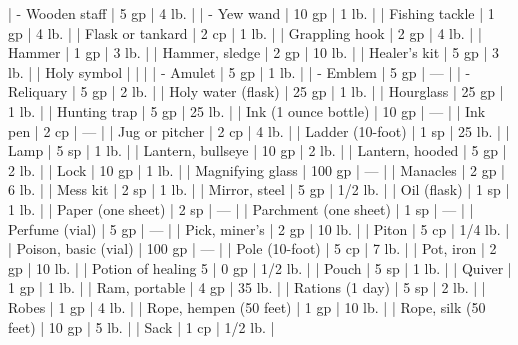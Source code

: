 | - Wooden staff               | 5 gp     | 4 lb.        |
| - Yew wand                   | 10 gp    | 1 lb.        |
| Fishing tackle               | 1 gp     | 4 lb.        |
| Flask or tankard             | 2 cp     | 1 lb.        |
| Grappling hook               | 2 gp     | 4 lb.        |
| Hammer                       | 1 gp     | 3 lb.        |
| Hammer, sledge               | 2 gp     | 10 lb.       |
| Healer's kit                 | 5 gp     | 3 lb.        |
| Holy symbol            |          |              |
| - Amulet                     | 5 gp     | 1 lb.        |
| - Emblem                     | 5 gp     | —            |
| - Reliquary                  | 5 gp     | 2 lb.        |
| Holy water (flask)           | 25 gp    | 1 lb.        |
| Hourglass                    | 25 gp    | 1 lb.        |
| Hunting trap                 | 5 gp     | 25 lb.       |
| Ink (1 ounce bottle)         | 10 gp    | —            |
| Ink pen                      | 2 cp     | —            |
| Jug or pitcher               | 2 cp     | 4 lb.        |
| Ladder (10-foot)             | 1 sp     | 25 lb.       |
| Lamp                         | 5 sp     | 1 lb.        |
| Lantern, bullseye            | 10 gp    | 2 lb.        |
| Lantern, hooded              | 5 gp     | 2 lb.        |
| Lock                         | 10 gp    | 1 lb.        |
| Magnifying glass             | 100 gp   | —            |
| Manacles                     | 2 gp     | 6 lb.        |
| Mess kit                     | 2 sp     | 1 lb.        |
| Mirror, steel                | 5 gp     | 1/2 lb.      |
| Oil (flask)                  | 1 sp     | 1 lb.        |
| Paper (one sheet)            | 2 sp     | —            |
| Parchment (one sheet)        | 1 sp     | —            |
| Perfume (vial)               | 5 gp     | —            |
| Pick, miner's                | 2 gp     | 10 lb.       |
| Piton                        | 5 cp     | 1/4 lb.      |
| Poison, basic (vial)         | 100 gp   | —            |
| Pole (10-foot)               | 5 cp     | 7 lb.        |
| Pot, iron                    | 2 gp     | 10 lb.       |
| Potion of healing 5          | 0 gp     | 1/2 lb.      |
| Pouch                        | 5 sp     | 1 lb.        |
| Quiver                       | 1 gp     | 1 lb.        |
| Ram, portable                | 4 gp     | 35 lb.       |
| Rations (1 day)              | 5 sp     | 2 lb.        |
| Robes                        | 1 gp     | 4 lb.        |
| Rope, hempen (50 feet)       | 1 gp     | 10 lb.       |
| Rope, silk (50 feet)         | 10 gp    | 5 lb.        |
| Sack                         | 1 cp     | 1/2 lb.      |

